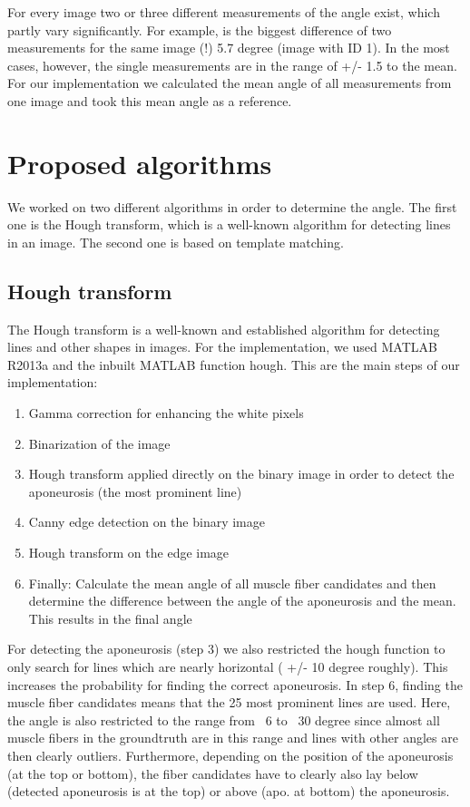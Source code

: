 \documentclass[10pt,twocolumn,letterpaper]{article}
\begin{document}
For every image two or three different measurements of the angle exist, which partly vary significantly. For example, is the biggest difference of two measurements for the same image (!) 5.7 degree (image with ID 1). In the most cases, however, the single measurements are in the range of +/- 1.5 to the mean.
For our implementation we calculated the mean angle of all measurements from one image and took this mean angle as a reference.

\section{Proposed algorithms}
We worked on two different algorithms in order to determine the angle. The first one is the Hough transform, which is a well-known algorithm for detecting lines in an image. The second one is based on template matching.

\subsection{Hough transform}
The Hough transform is a well-known and established algorithm for detecting lines and other shapes in images. For the implementation, we used MATLAB R2013a and the inbuilt MATLAB function hough.
This are the main steps of our implementation:

\begin{enumerate}
     \item Gamma correction for enhancing the white pixels
     \item Binarization of the image
     \item Hough transform applied directly on the binary image in order to detect the aponeurosis (the most prominent line)
     \item Canny edge detection on the binary image
     \item Hough transform on the edge image
     \item Finally: Calculate the mean angle of all muscle fiber candidates and then determine the difference between the angle of the aponeurosis and the mean. This results in the final angle
\end{enumerate}

For detecting the aponeurosis (step 3) we also restricted the hough function to only search for lines which are nearly horizontal ( +/- 10 degree roughly). This increases the probability for finding the correct aponeurosis. In step 6, finding the muscle fiber candidates means that the 25 most prominent lines are used. Here, the angle is also restricted to the range from ~6 to ~30 degree since almost all muscle fibers in the groundtruth are in this range and lines with other angles are then clearly outliers. Furthermore, depending on the position of the aponeurosis (at the top or bottom), the fiber candidates have to clearly also lay below (detected aponeurosis is at the top) or above (apo. at bottom) the aponeurosis.
\end{document}
